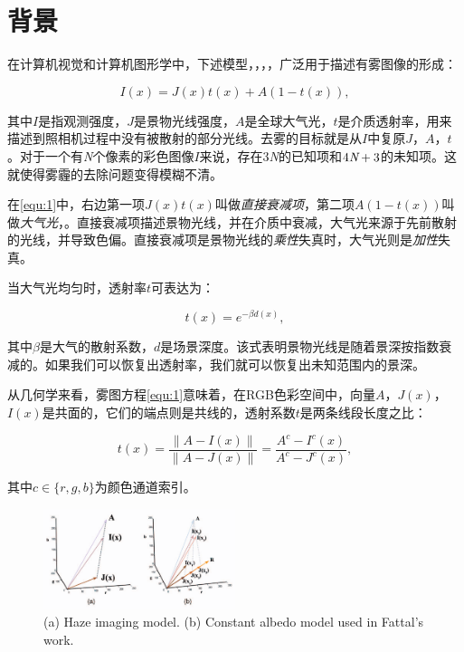 \documentclass{ctexart}
\begin{document}
\section{背景}
在计算机视觉和计算机图形学中，下述模型\cite{NarasimhanNayar2002}，\cite{NarasimhanNayar2000}，\cite{Fattal2008}，\cite{Tan2008}，广泛用于描述有雾图像的形成：

\begin{equation}\label{equ:1}
	I(x) = J(x)t(x) + A(1 - t(x)),
\end{equation}

其中$I$是指观测强度，$J$是景物光线强度，$A$是全球大气光，$t$是介质透射率，用来描述到照相机过程中没有被散射的部分光线。去雾的目标就是从$I$中复原$J$，$A$，$t$。对于一个有\emph{N}个像素的彩色图像$I$来说，存在3\emph{N}的已知项和$4\emph{N}+3$的未知项。这就使得雾霾的去除问题变得模糊不清。\par

在\ref{equ:1}中，右边第一项$J(x)t(x)$叫做\emph{直接衰减项}\cite{Tan2008}，第二项$A(1 - t(x))$叫做\emph{大气光}\cite{Koschmieder1924}，\cite{Tan2008}。直接衰减项描述景物光线，并在介质中衰减，大气光来源于先前散射的光线，并导致色偏。直接衰减项是景物光线的\emph{乘性}失真时，大气光则是\emph{加性}失真。\par

当大气光均匀时，透射率$t$可表达为：

\begin{equation}\label{equ:2}
	t(x) = e^{-\beta d(x)},
\end{equation}

其中$\beta$是大气的散射系数，$d$是场景深度。该式表明景物光线是随着景深按指数衰减的。如果我们可以恢复出透射率，我们就可以恢复出未知范围内的景深。\par

从几何学来看，雾图方程\ref{equ:1}意味着，在RGB色彩空间中，向量$A$，$J(x)$，$I(x)$是共面的，它们的端点则是共线的，透射系数$t$是两条线段长度之比：

\begin{equation}\label{equ:3}
	t(x) = \frac{\| A - I(x) \|}{\| A - J(x) \|} = \frac{A^c - I^c(x)}{A^c - J^c(x)},
\end{equation}

其中$c \in \{r, g, b\} $为颜色通道索引。\par

\begin{figure}[bp]
	\centering
	\includegraphics[width=0.5\textwidth]{img/01.png}
	\caption{(a) Haze imaging model. (b) Constant albedo model used in Fattal’s work\cite{Fattal2008}.}\label{fig:02}
\end{figure}
\end{document}
